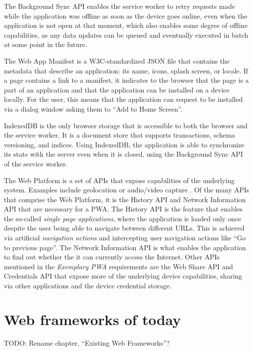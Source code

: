 \documentclass[english,odsaz]{fitthesis}
\begin{document}
The Background Sync API enables the service worker to retry requests made while
the application was offline as soon as the device goes online, even when the
application is not open at that moment, which also enables some degree of
offline capabilities, as any data updates can be queued and eventually executed in
batch at some point in the future.

The Web App Manifest is a W3C-standardized JSON file \cite{webapp-manifest} that
contains the metadata that describe an application: its name, icons, splash
screen, or locale. If a page contains a link to a manifest, it indicates to the
browser that the page is a part of an application and that the application can
be installed on a device locally. For the user, this means that the application
can request to be installed via a dialog window asking them to ``Add to Home
Screen''.

IndexedDB is the only browser storage that is accessible to both the browser and
the service worker. It is a document store that supports transactions, schema
versioning, and indices. Using IndexedDB, the application is able to synchronize
its state with the server even when it is closed, using the Background Sync API
of the service worker.

The Web Platform is a set of APIs that expose capabilities of the underlying
system. Examples include geolocation or audio/video capture
\cite{what_web_can_do}. Of the many APIs that comprise the Web Platform, it is the
History API and Network Information API that are necessary for a PWA. The
History API is the feature that enables the so-called \emph{single page applications},
where the application is loaded only once despite the user being able to
navigate between different URLs. This is achieved via artificial \emph{navigation
actions} and intercepting user navigation actions like ``Go to previous page''. The
Network Information API is what enables the application to find out whether the
it can currently access the Internet. Other APIs mentioned in the \emph{Exemplary PWA}
requirements are the Web Share API and Credentials API that expose more of the
underlying device capabilities, sharing via other applications and the device
credential storage.

\chapter{Web frameworks of today}
\label{sec:orga8a4a27}
TODO: Rename chapter, ``Existing Web Frameworks''?
\end{document}
